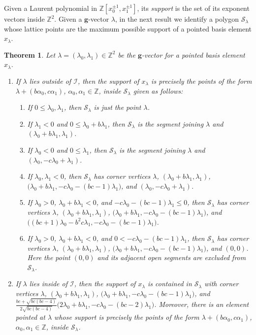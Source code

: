 \documentclass{amsart}
\newtheorem{theorem}{Theorem}
\numberwithin{theorem}{section}
\newcommand{\bfg}{\boldsymbol{g}}
\newcommand{\cI}{\mathcal{I}}
\newcommand{\cS}{\mathcal{S}}
\newcommand{\ZZ}{\mathbb{Z}}
\begin{document}
  Given a Laurent polynomial in $\ZZ[x_0^{\pm1},x_1^{\pm1}]$, its \emph{support} is the set of its exponent vectors inside $\ZZ^2$.
  Given a $\bfg$-vector $\lambda$, in the next result we identify a polygon $\cS_\lambda$ whose lattice points are the maximum possible support of a pointed basis element $x_\lambda$. 
  \begin{theorem}
    \label{th:maximum support}
    Let $\lambda=(\lambda_0,\lambda_1)\in\ZZ^2$ be the $\bfg$-vector for a pointed basis element $x_\lambda$.
    \begin{enumerate}
      \item If $\lambda$ lies outside of $\cI$, then the support of $x_\lambda$ is precisely the points of the form $\lambda+(b \alpha_0 ,c \alpha_1)$, $\alpha_0,\alpha_1\in\ZZ$, inside $\cS_\lambda$ given as follows:
        \begin{enumerate}
          \item If $0\le\lambda_0,\lambda_1$, then $\cS_\lambda$ is just the point $\lambda$.
          \item If $\lambda_1 < 0$ and $0\le\lambda_0+b\lambda_1$, then $\cS_\lambda$ is the segment joining $\lambda$ and $(\lambda_0+b\lambda_1,\lambda_1)$.
          \item If $\lambda_0 < 0$ and $0\le\lambda_1$, then $\cS_\lambda$ is the segment joining $\lambda$ and $(\lambda_0,-c\lambda_0+\lambda_1)$.
          \item If $\lambda_0,\lambda_1 < 0$, then $\cS_\lambda$ has corner vertices $\lambda$, $(\lambda_0+b\lambda_1,\lambda_1)$, $\big(\lambda_0+b\lambda_1,-c\lambda_0-(bc-1)\lambda_1\big)$, and $(\lambda_0,-c\lambda_0+\lambda_1)$.
          \item If $\lambda_0 > 0$, $\lambda_0+b\lambda_1 < 0$, and $-c\lambda_0-(bc-1)\lambda_1\le 0$, then $\cS_\lambda$ has corner vertices $\lambda$, $(\lambda_0+b\lambda_1,\lambda_1)$, $\big(\lambda_0+b\lambda_1,-c\lambda_0-(bc-1)\lambda_1\big)$, and $\big((bc+1)\lambda_0-b^2c\lambda_1,-c\lambda_0-(bc-1)\lambda_1\big)$.
          \item If $\lambda_0 > 0$, $\lambda_0+b\lambda_1 < 0$, and $0 < -c\lambda_0-(bc-1)\lambda_1$, then $\cS_\lambda$ has corner vertices $\lambda$, $(\lambda_0+b\lambda_1,\lambda_1)$, $\big(\lambda_0+b\lambda_1,-c\lambda_0-(bc-1)\lambda_1\big)$, and $(0,0)$.  Here the point $(0,0)$ and its adjacent open segments are excluded from $\cS_\lambda$.
        \end{enumerate}
      \item If $\lambda$ lies inside of $\cI$, then the support of $x_\lambda$ is contained in $\cS_\lambda$ with corner vertices $\lambda$, $(\lambda_0+b\lambda_1,\lambda_1)$, $\big(\lambda_0+b\lambda_1,-c\lambda_0-(bc-1)\lambda_1\big)$, and $\frac{bc+\sqrt{bc(bc-4)}}{2\sqrt{bc(bc-4)}}\big(2\lambda_0+b\lambda_1,-c\lambda_0-(bc-2)\lambda_1\big)$.
        Moreover, there is an element pointed at $\lambda$ whose support is precisely the points of the form $\lambda+(b \alpha_0 ,c \alpha_1)$, $\alpha_0,\alpha_1\in\ZZ$, inside $\cS_\lambda$.
    \end{enumerate}
  \end{theorem}
\end{document}
